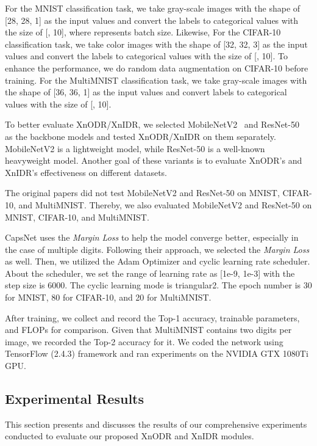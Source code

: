 \documentclass[sn-mathphys,iicol,Numbered]{sn-jnl}
\begin{document}
For the MNIST classification task, we take gray-scale images with the shape of [28, 28, 1] as the input values and convert the labels to categorical values with the size of [, 10], where  represents batch size. Likewise, For the CIFAR-10 classification task, we take color images with the shape of [32, 32, 3] as the input values and convert the labels to categorical values with the size of [, 10]. To enhance the performance, we do random data augmentation on CIFAR-10 before training. For the MultiMNIST classification task, we take gray-scale images with the shape of [36, 36, 1] as the input values and convert labels to categorical values with the size of [, 10]. 

To better evaluate XnODR/XnIDR, we selected MobileNetV2~\citep{A18_MBV2} and ResNet-50~\citep{A19_RES50} as the backbone models and tested XnODR/XnIDR on them separately. MobileNetV2 is a lightweight model, while ResNet-50 is a well-known heavyweight model. Another goal of these variants is to evaluate XnODR's and XnIDR's effectiveness on different datasets.

The original papers did not test MobileNetV2 and ResNet-50 on MNIST, CIFAR-10, and MultiMNIST. Thereby, we also evaluated MobileNetV2 and ResNet-50 on MNIST, CIFAR-10, and MultiMNIST.

CapsNet uses the \textit{Margin Loss} to help the model converge better, especially in the case of multiple digits. Following their approach, we selected the \textit{Margin Loss} as well. Then, we utilized the Adam Optimizer and cyclic learning rate scheduler. About the scheduler, we set the range of learning rate as [1e-9, 1e-3] with the step size is 6000. The cyclic learning mode is triangular2. The epoch number is 30 for MNIST, 80 for CIFAR-10, and 20 for MultiMNIST.

After training, we collect and record the Top-1 accuracy, trainable parameters, and FLOPs for comparison. Given that MultiMNIST contains two digits per image, we recorded the Top-2 accuracy for it. We coded the network using TensorFlow (2.4.3) framework and ran experiments on the NVIDIA GTX 1080Ti GPU.

\subsection{Experimental Results} \label{sec:4.4}

This section presents and discusses the results of our comprehensive experiments conducted to evaluate our proposed XnODR and XnIDR modules.
\end{document}
